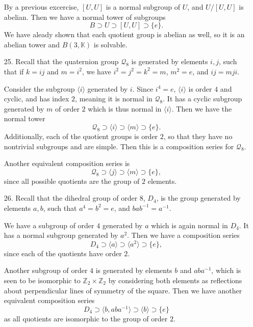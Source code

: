 \documentclass[11pt, reqno]{article}
\theoremstyle{plain}
\theoremstyle{definition}
\theoremstyle{remark}
\newcommand{\ZZ}{\mathbb{Z}}
\begin{document}
\begin{enumerate}
    By a previous excercise, $[U, U]$ is a normal subgroup of $U$, and $U/[U, U]$ is abelian. Then we have a 
    normal tower of subgroups 
    \[
        B \supset U \supset [U, U] \supset \{e\}.
    \]
    We have aleady shown that each quotient group is abelian as well, so it is an abelian tower and 
    $B(3, \mathbb{K})$ is solvable. 
    
    \item[25.] Recall that the quaternion group $\mathcal{Q}_8$ is generated by elements $i, j$, such that 
    if $k = ij$ and $m = i^2$, we have $i^2 = j^2 = k^2 = m$, $m^2 = e$, and $ij = mji$.

    Consider the subgroup $\langle i \rangle$ generated by $i$. Since $i^4 = e$, $\langle i \rangle $ is 
    order $4$ and cyclic, and has index $2$, meaning it is normal in $\mathcal{Q}_8$. It has a cyclic
    subgroup generated by $m$ of order $2$ which is thus normal in $\langle i \rangle$. Then we have 
    the normal tower 
    \[
        \mathcal{Q}_8 \supset \langle i \rangle \supset \langle m \rangle \supset \{e\}.
    \]
    Additionally, each of the quotient groups is order $2$, so that they have no nontrivial subgroups 
    and are simple. Then this is a composition series for $\mathcal{Q}_8$.

    Another equivalent composition series is
    \[
        \mathcal{Q}_8 \supset \langle j \rangle \supset \langle m \rangle \supset \{e\},
    \]
    since all possible quotients are the group of $2$ elements. 

    \item[26.] Recall that the dihedral group of order $8$, $D_4$, is the group generated by elements 
    $a, b$, such that $a^4 = b^2 = e$, and $bab^{-1} = a^{-1}$. 

    We have a subgroup of order $4$ generated by $a$ which is again normal in $D_4$. It has 
    a normal subgroup generated by $a^2$. Then we have a composition series 
    \[
        D_4 \supset \langle a \rangle \supset \langle a^2 \rangle \supset \{e\},
    \]
    since each of the quotients have order $2$. 

    Another subgroup of order $4$ is generated by elements $b$ and $aba^{-1}$, which is seen to 
    be isomorphic to $\ZZ_2 \times \ZZ_2$ by considering both elements as reflections about perpendicular 
    lines of symmetry of the square. Then we have another equivalent composition series 
    \[
        D_4 \supset \langle b, aba^{-1}\rangle \supset \langle b \rangle \supset \{e\}
    \]
    as all quotients are isomorphic to the group of order $2$. 


\end{enumerate}
\end{document}
